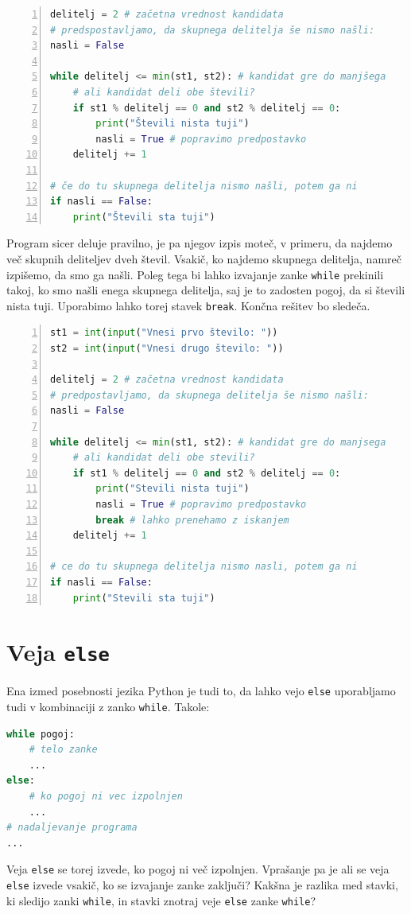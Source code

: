 \begin{resitev}
\begin{lstlisting}[language=Python, showstringspaces=false,numbers=left]
delitelj = 2 # začetna vrednost kandidata
# predspostavljamo, da skupnega delitelja še nismo našli:
nasli = False 

while delitelj <= min(st1, st2): # kandidat gre do manjšega
    # ali kandidat deli obe števili?
    if st1 % delitelj == 0 and st2 % delitelj == 0:
        print("Števili nista tuji")
        nasli = True # popravimo predpostavko
    delitelj += 1

# če do tu skupnega delitelja nismo našli, potem ga ni        
if nasli == False: 
    print("Števili sta tuji")
\end{lstlisting}
Program sicer deluje pravilno, je pa njegov izpis moteč, v primeru, da najdemo več skupnih deliteljev dveh števil. Vsakič, ko najdemo skupnega delitelja, namreč izpišemo, da smo ga našli. Poleg tega bi lahko izvajanje zanke \texttt{while} prekinili takoj, ko smo našli enega skupnega delitelja, saj je to zadosten pogoj, da si števili nista tuji. Uporabimo lahko torej stavek \texttt{break}. Končna rešitev bo sledeča.
\begin{lstlisting}[language=Python, showstringspaces=false,numbers=left]
st1 = int(input("Vnesi prvo število: "))
st2 = int(input("Vnesi drugo število: "))

delitelj = 2 # začetna vrednost kandidata
# predpostavljamo, da skupnega delitelja še nismo našli:
nasli = False 

while delitelj <= min(st1, st2): # kandidat gre do manjsega
    # ali kandidat deli obe stevili?
    if st1 % delitelj == 0 and st2 % delitelj == 0:
        print("Stevili nista tuji")
        nasli = True # popravimo predpostavko
        break # lahko prenehamo z iskanjem
    delitelj += 1 

# ce do tu skupnega delitelja nismo nasli, potem ga ni        
if nasli == False: 
    print("Stevili sta tuji")
\end{lstlisting}
\end{resitev}

\section{Veja \texttt{else}}
Ena izmed posebnosti jezika Python je tudi to, da lahko vejo \texttt{else} uporabljamo tudi v kombinaciji z zanko \texttt{while}. Takole:
\begin{lstlisting}[language=Python, showstringspaces=false]
while pogoj:
    # telo zanke
    ...
else:
    # ko pogoj ni vec izpolnjen
    ...
# nadaljevanje programa
...
\end{lstlisting}
Veja \texttt{else} se torej izvede, ko pogoj ni več izpolnjen. Vprašanje pa je ali se veja \texttt{else} izvede vsakič, ko se izvajanje zanke zaključi? Kakšna je razlika med stavki, ki sledijo zanki \texttt{while}, in stavki znotraj veje \texttt{else} zanke \texttt{while}? 

